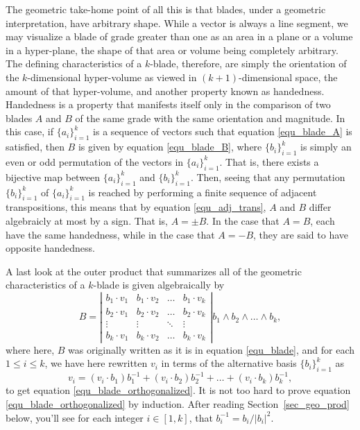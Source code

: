 \documentclass[12pt]{article}
\numberwithin{equation}{section}
\begin{document}
The geometric take-home point of all this is that blades, under a geometric interpretation,
have arbitrary shape.  While a vector is always a line segment, we may visualize a blade of
grade greater than one
as an area in a plane or a volume in a hyper-plane, the shape of that area or volume being completely
arbitrary.  The defining characteristics of a $k$-blade, therefore, are simply the orientation of the $k$-dimensional
hyper-volume as viewed in $(k+1)$-dimensional space,
the amount of that hyper-volume, and another property known as handedness.
Handedness is a property
that manifests itself only in the comparison of two blades $A$ and $B$ of the same grade with
the same orientation
and magnitude.  In this case, if $\{a_i\}_{i=1}^k$ is a sequence of vectors such
that equation \eqref{equ_blade_A} is satisfied, then $B$ is given by equation
\eqref{equ_blade_B}, where $\{b_i\}_{i=1}^k$ is simply an even or odd permutation
of the vectors in $\{a_i\}_{i=1}^k$.  That is, there exists a bijective map between
$\{a_i\}_{i=1}^k$ and $\{b_i\}_{i=1}^k$.
Then, seeing that any permutation $\{b_i\}_{i=1}^k$ of $\{a_i\}_{i=1}^k$
is reached by performing a finite sequence of adjacent transpositions, this means that
by equation \eqref{equ_adj_trans}, $A$ and $B$ differ algebraicly at most by a sign.
That is, $A=\pm B$.  In the case that $A=B$, each have the same handedness,
while in the case that $A=-B$, they are said to have opposite handedness.

A last look at the outer product that summarizes all of the geometric characteristics of a $k$-blade
is given algebraically by
\begin{equation}\label{equ_blade_orthogonalized}
B = \left|\begin{array}{cccc}
b_1\cdot v_1 & b_1\cdot v_2 & \dots & b_1\cdot v_k \\
b_2\cdot v_1 & b_2\cdot v_2 & \dots & b_2\cdot v_k \\
\vdots & \vdots & \ddots & \vdots \\
b_k\cdot v_1 & b_k\cdot v_2 & \dots & b_k\cdot v_k
\end{array}\right|b_1\wedge b_2\wedge\dots\wedge b_k,
\end{equation}
where here, $B$ was originally written as it is in equation \eqref{equ_blade}, and
for each $1\leq i\leq k$, we have here rewritten $v_i$ in terms of the alternative basis $\{b_i\}_{i=1}^k$ as
\begin{equation*}
v_i = (v_i\cdot b_1)b_1^{-1}+(v_i\cdot b_2)b_2^{-1}+\dots+(v_i\cdot b_k)b_k^{-1},
\end{equation*}
to get equation \eqref{equ_blade_orthogonalized}.  It is not too hard to
prove equation \eqref{equ_blade_orthogonalized} by induction.
After reading Section~\ref{sec_geo_prod} below, you'll see
for each integer $i\in[1,k]$, that $b_i^{-1}=b_i/|b_i|^2$.
\end{document}
